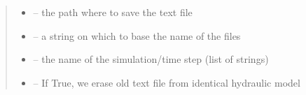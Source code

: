 \documentclass[letterpaper,10pt,english]{sphinxmanual}
\begin{document}
\begin{fulllineitems}
\begin{quote}
\begin{description}
\begin{itemize}
\item {} 
 -- the path where to save the text file

\item {} 
 -- a string on which to base the name of the files

\item {} 
 -- the name of the simulation/time step (list of strings)

\item {} 
 -- If True, we erase old text file from identical hydraulic model

\end{itemize}

\end{description}\end{quote}

\end{fulllineitems}

\end{document}
